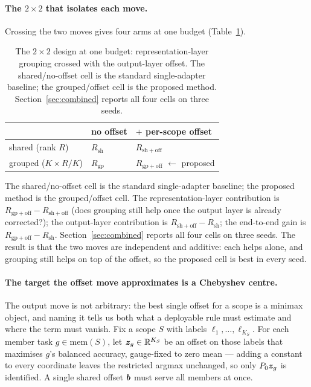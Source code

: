 \paragraph{The $2\times2$ that isolates each move.}
Crossing the two moves gives four arms at one budget (Table~\ref{tab:method-grid}).
\begin{table}[t]
\centering
\small
\caption{The $2\times2$ design at one budget: representation-layer grouping crossed
with the output-layer offset. The shared/no-offset cell is the standard
single-adapter baseline; the grouped/offset cell is the proposed method.
Section~\ref{sec:combined} reports all four cells on three seeds.}
\label{tab:method-grid}
\begin{tabular}{lll}
\toprule
 & no offset & $+$ per-scope offset \\
\midrule
shared (rank $R$)          & $R_{\mathrm{sh}}$ & $R_{\mathrm{sh{+}off}}$ \\
grouped ($K\times R/K$)    & $R_{\mathrm{gp}}$ & $R_{\mathrm{gp{+}off}}$ \quad$\leftarrow$ proposed \\
\bottomrule
\end{tabular}
\end{table}
The shared/no-offset cell is the standard single-adapter baseline; the proposed
method is the grouped/offset cell. The representation-layer contribution is
$R_{\mathrm{gp{+}off}}-R_{\mathrm{sh{+}off}}$ (does grouping still help once the
output layer is already corrected?); the output-layer contribution is
$R_{\mathrm{sh{+}off}}-R_{\mathrm{sh}}$; the end-to-end gain is
$R_{\mathrm{gp{+}off}}-R_{\mathrm{sh}}$. Section~\ref{sec:combined} reports all
four cells on three seeds. The result is that the two moves are independent and
additive: each helps alone, and grouping still helps on top of the offset, so the
proposed cell is best in every seed.

\paragraph{The target the offset move approximates is a Chebyshev centre.}
The output move is not arbitrary: the best single offset for a scope is a
minimax object, and naming it tells us both what a deployable rule must estimate
and where the term must vanish. Fix a scope $S$ with labels
$\ell_1,\dots,\ell_{K_S}$. For each member task $g\in\mathrm{mem}(S)$, let
$\bm{z}_g\in\mathbb{R}^{K_S}$ be an offset on those labels that maximises $g$'s balanced
accuracy, gauge-fixed to zero mean --- adding a constant to every coordinate
leaves the restricted argmax unchanged, so only $P_0\bm{z}_g$ is identified. A single
shared offset $\bm{b}$ must serve all members at once.

